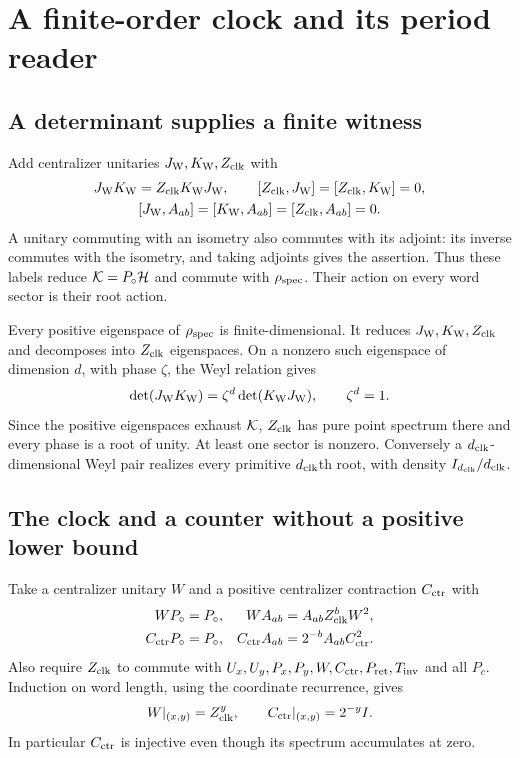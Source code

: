 \section{A finite-order clock and its period reader}\label{sec:clock}
\subsection{A determinant supplies a finite witness}
Add centralizer unitaries $J_{\rm W},K_{\rm W},Z_{\rm clk}$ with
\begin{equation}\label{eq:weyl}
\begin{gathered}
 J_{\rm W}K_{\rm W}=Z_{\rm clk}K_{\rm W}J_{\rm W},\qquad
 [Z_{\rm clk},J_{\rm W}]=[Z_{\rm clk},K_{\rm W}]=0,\\
 [J_{\rm W},A_{ab}]=[K_{\rm W},A_{ab}]=[Z_{\rm clk},A_{ab}]=0.
\end{gathered}
\end{equation}
A unitary commuting with an isometry also commutes with its adjoint: its inverse commutes with the isometry, and taking adjoints gives the assertion. Thus these labels reduce $\mathcal K=P_{\circ}\mathcal H$ and commute with $\rho_{\rm spec}$. Their action on every word sector is their root action.

Every positive eigenspace of $\rho_{\rm spec}$ is finite-dimensional. It reduces $J_{\rm W},K_{\rm W},Z_{\rm clk}$ and decomposes into $Z_{\rm clk}$ eigenspaces. On a nonzero such eigenspace of dimension $d$, with phase $\zeta$, the Weyl relation gives
\begin{equation}\label{eq:det}
 \det(J_{\rm W}K_{\rm W})=\zeta^d\det(K_{\rm W}J_{\rm W}),\qquad \zeta^d=1.
\end{equation}
Since the positive eigenspaces exhaust $\mathcal K$, $Z_{\rm clk}$ has pure point spectrum there and every phase is a root of unity. At least one sector is nonzero. Conversely a ${d_{\rm clk}}$-dimensional Weyl pair realizes every primitive ${d_{\rm clk}}$th root, with density $I_{d_{\rm clk}}/{d_{\rm clk}}$.

\subsection{The clock and a counter without a positive lower bound}
Take a centralizer unitary $W$ and a positive centralizer contraction $C_{\rm ctr}$ with
\begin{align}
 WP_{\circ}&=P_{\circ},&WA_{ab}&=A_{ab}Z_{\rm clk}^bW^2,\label{eq:W}\\
 C_{\rm ctr}P_{\circ}&=P_{\circ},&C_{\rm ctr}A_{ab}&=2^{-b}A_{ab}C_{\rm ctr}^2.\label{eq:C}
\end{align}
Also require $Z_{\rm clk}$ to commute with $U_x,U_y,P_x,P_y,W,C_{\rm ctr},P_{\rm ret},T_{\rm inv}$ and all $P_c$. Induction on word length, using the coordinate recurrence, gives
\begin{equation}\label{eq:coordinateclock}
 W|_{(x,y)}=Z_{\rm clk}^y,\qquad C_{\rm ctr}|_{(x,y)}=2^{-y}I.
\end{equation}
In particular $C_{\rm ctr}$ is injective even though its spectrum accumulates at zero.

